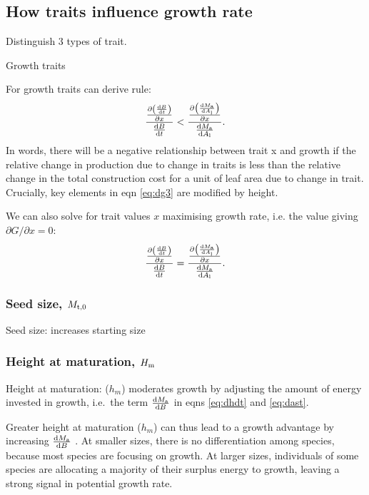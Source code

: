 \documentclass[a4paper,11pt]{article}
\begin{document}
\subsection{How traits influence growth rate}

Distinguish 3 types of trait.

Growth traits

For growth traits can derive rule:
\begin{equation}\label{eq:dg4}
\frac{\frac{\partial \left( \frac{ {\rm d}B} {{\rm d}t}\right)}{\partial x}} {\frac{ {\rm d}B} {{\rm d}t}} < \frac{ \frac{\partial \left(\frac{{\rm d}M_{\rm a}} {{\rm d}A_{\rm l}}\right)}{\partial x}}{\frac{{\rm d}M_{\rm a}} {{\rm d}A_{\rm l}}}.
\end{equation}
In words, there will be a negative relationship between trait x and growth if the relative change in production due to change in traits is less than the relative change in the total construction cost for a unit of leaf area due to change in trait. Crucially, key elements in eqn \ref{eq:dg3} are modified by height.

We can also solve for trait values $x$ maximising growth rate, i.e. the value giving $\partial G /\partial x = 0$:
\begin{equation}\label{eq:max}
\frac{\frac{\partial \left( \frac{ {\rm d}B} {{\rm d}t}\right)}{\partial x} } {\frac{ {\rm d}B} {{\rm d}t}} = \frac{ \frac{\partial \left(\frac{{\rm d}M_{\rm a}} {{\rm d}A_{\rm l}}\right)}{\partial x}}{\frac{{\rm d}M_{\rm a}} {{\rm d}A_{\rm l}}}.
\end{equation}

\subsubsection{Seed size, $M_{\rm t,0}$}

Seed size: increases starting size

\subsubsection{Height at maturation, $H_{\rm m}$}

Height at maturation: ($h_m$) moderates growth by adjusting the amount of energy invested in growth, i.e.~the term $\frac{{\rm d}M_{\rm a}}{{\rm d}B}$ in eqns \ref{eq:dhdt} and \ref{eq:dast}.

Greater height at maturation ($h_m$) can thus lead to a growth advantage by increasing $\frac{{\rm d}M_{\rm a}}{{\rm d}B}$ . At smaller sizes, there is no differentiation among species, because most species are focusing on growth. At larger sizes, individuals of some species are allocating a majority of their surplus energy to growth, leaving a strong signal in potential growth rate.
\end{document}
